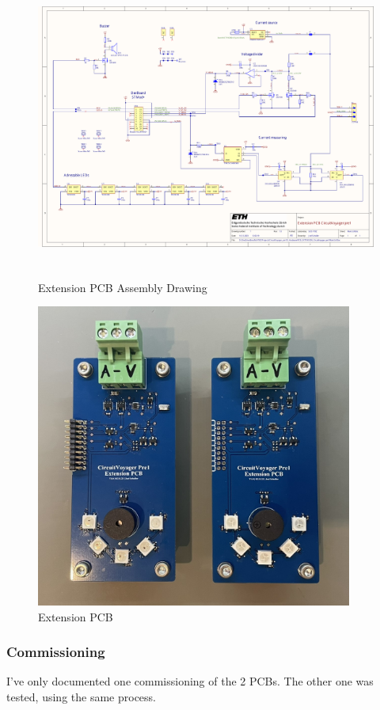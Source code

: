 \begin{figure}[H]
	\centering
	\includegraphics[height=10cm, page=2]{../../../5_Hardware/PCB_EXTENSION_CircuitVoyager_pre1/Project Outputs for PCB_EXT_CV_PRE1/PCB_EXTENSION_CircuitVoyager_pre1.pdf}
	\caption{Extension PCB Assembly Drawing}
	\label{fig:Extension PCB Assembly Drawing}
\end{figure}



\begin{figure}[H]
	\centering
	\includegraphics[height=10cm]{Resources/PCB.png}
	\caption{Extension PCB}
	\label{fig:Extension PCB}
\end{figure}

\newpage
\subsubsection{Commissioning}
\label{subsec:commissioning}
I've only documented one commissioning of the 2 PCBs. The other one was tested, using the same process.

